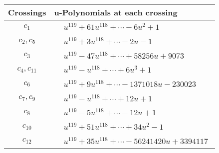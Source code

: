 \documentclass[1p]{elsarticle_modified}
\theoremstyle{definition}
\begin{document}
\begin{tabular}{m{50pt}|m{274pt}}
Crossings & \hspace{64pt}u-Polynomials at each crossing \\
\hline $$\begin{aligned}c_{1}\end{aligned}$$&$\begin{aligned}
&u^{119}+61 u^{118}+\cdots-6 u^2+1
\end{aligned}$\\
\hline $$\begin{aligned}c_{2},c_{5}\end{aligned}$$&$\begin{aligned}
&u^{119}+3 u^{118}+\cdots-2 u-1
\end{aligned}$\\
\hline $$\begin{aligned}c_{3}\end{aligned}$$&$\begin{aligned}
&u^{119}-47 u^{118}+\cdots+58256 u+9073
\end{aligned}$\\
\hline $$\begin{aligned}c_{4},c_{11}\end{aligned}$$&$\begin{aligned}
&u^{119}- u^{118}+\cdots+6 u^3+1
\end{aligned}$\\
\hline $$\begin{aligned}c_{6}\end{aligned}$$&$\begin{aligned}
&u^{119}+9 u^{118}+\cdots-1371018 u-230023
\end{aligned}$\\
\hline $$\begin{aligned}c_{7},c_{9}\end{aligned}$$&$\begin{aligned}
&u^{119}- u^{118}+\cdots+12 u+1
\end{aligned}$\\
\hline $$\begin{aligned}c_{8}\end{aligned}$$&$\begin{aligned}
&u^{119}-5 u^{118}+\cdots-12 u+1
\end{aligned}$\\
\hline $$\begin{aligned}c_{10}\end{aligned}$$&$\begin{aligned}
&u^{119}+51 u^{118}+\cdots+34 u^2-1
\end{aligned}$\\
\hline $$\begin{aligned}c_{12}\end{aligned}$$&$\begin{aligned}
&u^{119}+35 u^{118}+\cdots-56241420 u+3394117
\end{aligned}$\\
\hline
\end{tabular}\\~\\
\end{document}
